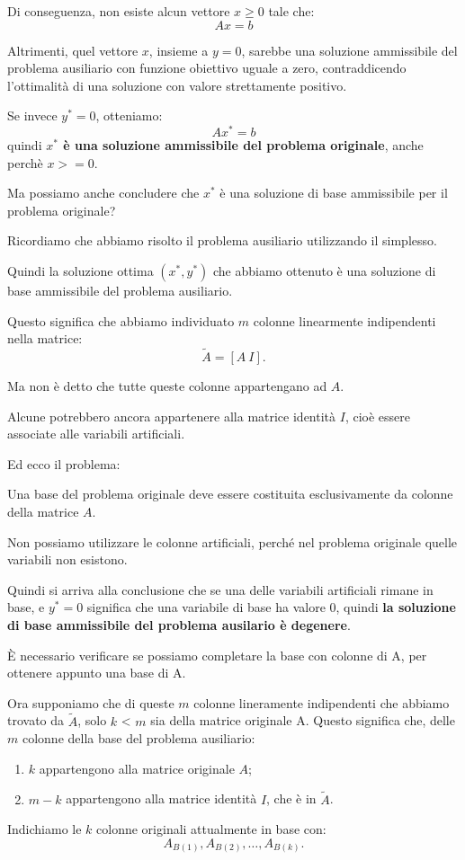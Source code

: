 Di conseguenza, non esiste alcun vettore \(x\geq0\) tale che:
\[
Ax=b
\]

Altrimenti, quel vettore \(x\), insieme a \(y=0\), sarebbe una soluzione ammissibile del problema ausiliario con funzione obiettivo uguale a zero, contraddicendo l'ottimalità di una soluzione con valore strettamente positivo.


Se invece $y^* = 0$, otteniamo:
\[
\boxed{Ax^*=b}
\]
quindi \textbf{$x^*$ è una soluzione ammissibile del problema originale}, anche perchè $x >= 0$.
\begin{center}
    Ma possiamo anche concludere che \(x^*\) è una soluzione di base ammissibile per il problema originale?
\end{center}
Ricordiamo che abbiamo risolto il problema ausiliario utilizzando il simplesso.

Quindi la soluzione ottima \((x^*,y^*)\) che abbiamo ottenuto è una soluzione di base ammissibile del problema ausiliario.

Questo significa che abbiamo individuato \(m\) colonne linearmente indipendenti nella matrice:
\[
\widetilde A=[A\ I].
\]

Ma non è detto che tutte queste colonne appartengano ad \(A\).

Alcune potrebbero ancora appartenere alla matrice identità \(I\), cioè essere associate alle variabili artificiali.

Ed ecco il problema:

Una base del problema originale deve essere costituita esclusivamente da colonne della matrice \(A\).

Non possiamo utilizzare le colonne artificiali, perché nel problema originale quelle variabili non esistono.

Quindi si arriva alla conclusione che se una delle variabili artificiali rimane in base, e $y^* = 0$ significa che una variabile di base ha valore 0, quindi \textbf{la soluzione di base ammissibile del problema ausilario è degenere}.

\begin{center}
    È necessario verificare se possiamo completare la base con colonne di A, per ottenere appunto una base di A.
\end{center}

Ora supponiamo che di queste $m$ colonne lineramente indipendenti che abbiamo trovato da $\widetilde{A}$, solo $k$ < $m$ sia della matrice originale A.
Questo significa che, delle \(m\) colonne della base del problema ausiliario:
\begin{enumerate}
    \item \(k\) appartengono alla matrice originale \(A\);
    \item \(m-k\) appartengono alla matrice identità \(I\), che è in $\widetilde{A}$.
\end{enumerate}
Indichiamo le \(k\) colonne originali attualmente in base con:
\[
A_{B(1)},A_{B(2)},\ldots,A_{B(k)}.
\]

